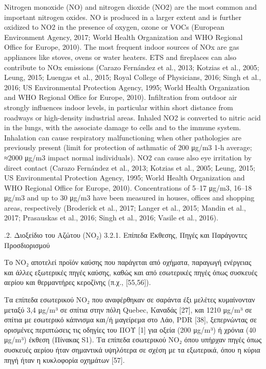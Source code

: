 Nitrogen monoxide (NO) and nitrogen dioxide (NO2) are the most common and important nitrogen oxides. NO is produced in a larger extent and is further oxidized to NO2 in the presence of oxygen, ozone or VOCs (European Environment Agency, 2017; World Health Organization and WHO Regional Office for Europe, 2010). The most frequent indoor sources of NOx are gas appliances like stoves, ovens or water heaters. ETS and fireplaces can also contribute to NOx emissions (Carazo Fernández et al., 2013; Kotzias et al., 2005; Leung, 2015; Luengas et al., 2015; Royal College of Physicians, 2016; Singh et al., 2016; US Environmental Protection Agency, 1995; World Health Organization and WHO Regional Office for Europe, 2010). Infiltration from outdoor air strongly influences indoor levels, in particular within short distance from roadways or high-density industrial areas. Inhaled NO2 is converted to nitric acid in the lungs, with the associate damage to cells and to the immune system. Inhalation can cause respiratory malfunctioning when other pathologies are previously present (limit for protection of asthmatic of 200 μg/m3 1-h average; ≈2000 μg/m3 impact normal individuals). NO2 can cause also eye irritation by direct contact (Carazo Fernández et al., 2013; Kotzias et al., 2005; Leung, 2015; US Environmental Protection Agency, 1995; World Health Organization and WHO Regional Office for Europe, 2010). Concentrations of 5–17 μg/m3, 16–18 μg/m3 and up to 30 μg/m3 have been measured in houses, offices and shopping areas, respectively (Broderick et al., 2017; Langer et al., 2015; Mandin et al., 2017; Prasauskas et al., 2016; Singh et al., 2016; Vasile et al., 2016).

\cite{GONZALEZMARTIN2021128376}


.2. Διοξείδιο του Αζώτου (NO₂)
3.2.1. Επίπεδα Έκθεσης, Πηγές και Παράγοντες Προσδιορισμού

Το NO₂ αποτελεί προϊόν καύσης που παράγεται από οχήματα, παραγωγή ενέργειας και άλλες εξωτερικές πηγές καύσης, καθώς και από εσωτερικές πηγές όπως συσκευές αερίου και θερμαντήρες κεροζίνης (π.χ., [55,56]).

Τα επίπεδα εσωτερικού NO₂ που αναφέρθηκαν σε σαράντα έξι μελέτες κυμαίνονταν μεταξύ 3,4 μg/m³ σε σπίτια στην πόλη Quebec, Καναδάς [27], και 1210 μg/m³ σε σπίτια με εσωτερικό κάπνισμα και/ή μαγείρεμα στο Λάο, PDR [38], ξεπερνώντας σε ορισμένες περιπτώσεις τις οδηγίες του ΠΟΥ [1] για οξεία (200 μg/m³) ή χρόνια (40 μg/m³) έκθεση (Πίνακας S1). Τα επίπεδα εσωτερικού NO₂ όπου υπήρχαν πηγές όπως συσκευές αερίου ήταν σημαντικά υψηλότερα σε σχέση με τα εξωτερικά, όπου η κύρια πηγή ήταν η κυκλοφορία οχημάτων [57].


